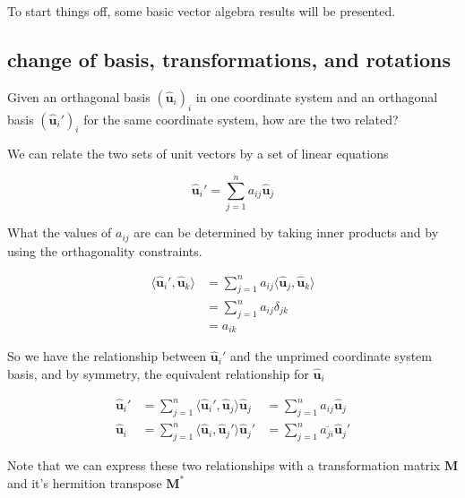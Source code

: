 \documentclass{article}      %
\newcommand{\Bu}[0]{\mathbf{u}}
\newcommand{\BM}[0]{\mathbf{M}}
\newcommand{\ucap}[1]{\hat{\Bu}_{#1}}
\newcommand{\innerprod}[2]{\langle{#1}, {#2}\rangle}
\begin{document}
To start things off, some basic vector algebra results will be presented.

\subsection{change of basis, transformations, and rotations}

Given an orthagonal basis $(\ucap{i})_i$ in one coordinate system and an
orthagonal basis $(\ucap{i}')_i$ for the same coordinate system, how are 
the two related?

We can relate the two sets of unit vectors by a set of linear equations

\begin{equation}
\ucap{i}' = \sum_{j=1}^n{a_{ij}\ucap{j}}
\end{equation}

What the values of $a_{ij}$ are can be determined by taking inner products and by using the 
orthagonality constraints.

\begin{align}
\innerprod{\ucap{i}'}{\ucap{k}} &= \sum_{j=1}^n{a_{ij}\innerprod{\ucap{j}}{\ucap{k}}} \\
                                &= \sum_{j=1}^n{a_{ij}\delta_{jk}} \\
                                &= a_{ik}
\end{align}

So we have the relationship between $\ucap{i}'$ and the unprimed coordinate system basis, and by 
symmetry, the equivalent relationship for $\ucap{i}$

\begin{align}
\ucap{i}' &= \sum_{j=1}^n{
\innerprod{\ucap{i}'}{\ucap{j}}
\ucap{j}
} 
&= \sum_{j=1}^n{
a_{ij}
\ucap{j}
} 
\\
\ucap{i} &= \sum_{j=1}^n{
\innerprod{\ucap{i}}{\ucap{j}'}
\ucap{j}'
}
&= \sum_{j=1}^n{
\overline{a_{ji}}
\ucap{j}'
} 
\end{align}

Note that we can express these two relationships with a transformation 
matrix $\BM$ and it's hermition transpose $\BM^*$
\end{document}
